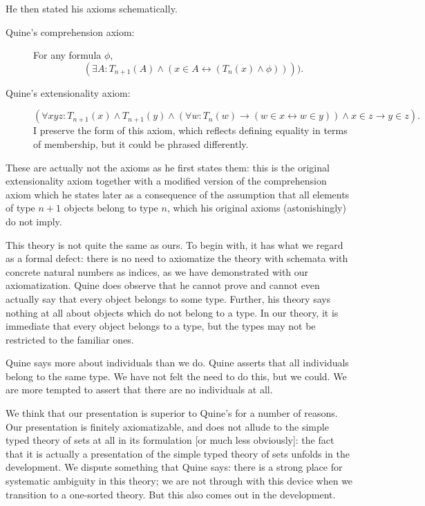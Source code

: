 \documentclass[12pt]{article}
\begin{document}
He then stated his axioms schematically.


\begin{description}

\item[Quine's comprehension axiom:]  For any formula $\phi$, $$(\exists A:  T_{n+1}(A) \wedge (x\in A \leftrightarrow (T_n(x) \wedge  \phi)))).$$

\item[Quine's extensionality axiom:]  $$(\forall xyz:T_{n+1}(x) \wedge  T_{n+1}(y) \wedge (\forall w:T_n(w) \rightarrow (w \in x \leftrightarrow w \in y)) \wedge x \in z \rightarrow y \in z).$$  I preserve the form of this axiom, which reflects defining equality in terms of membership, but it could be phrased differently.

\end{description}

These are actually not the axioms as he first states them:  this is the original extensionality axiom together with a modified version of the comprehension axiom which he states later as a consequence of the assumption that all elements of type $n+1$ objects belong to type $n$, which his original axioms (astonishingly) do not imply.

This theory is not quite the same as ours.  To begin with, it has what we regard as a formal defect:  there is no need to axiomatize the theory with schemata with concrete natural numbers as indices, as we have demonstrated with our axiomatization.  Quine does observe that he cannot prove and cannot even actually say that every object belongs to some type.  Further, his theory says nothing at all about objects which do not belong to a type. In our theory, it is immediate that every object belongs to a type, but the types may not be restricted to the familiar ones.

Quine says more about individuals than we do.  Quine asserts that all individuals belong to the same type.  We have not felt the need to do this, but we could.  We are more tempted to assert that there are no individuals at all.

We think that our presentation is superior to Quine's for a number of reasons.  Our presentation is finitely axiomatizable, and does not allude to the simple typed theory of sets at all in its formulation [or much less obviously]:  the fact that it is actually a presentation of the simple typed theory of sets unfolds in the development.  We dispute something that Quine says:  there is a strong place for systematic ambiguity in this theory; we are not through with this device when we transition to a one-sorted theory.  But this also comes out in the development.
\end{document}
